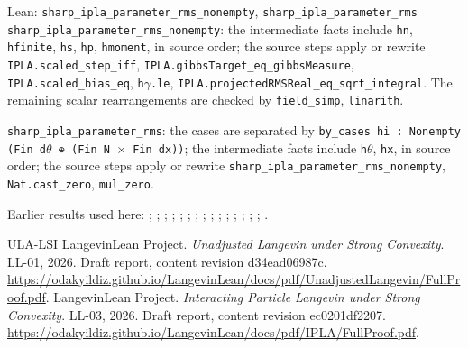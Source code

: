 \documentclass[11pt,a4paper]{article}
\begin{document}
\begin{leanbox}{Lean: \texttt{sharp\_\allowbreak{}ipla\_\allowbreak{}parameter\_\allowbreak{}rms\_\allowbreak{}nonempty}, \texttt{sharp\_\allowbreak{}ipla\_\allowbreak{}parameter\_\allowbreak{}rms}}
\texttt{sharp\_\allowbreak{}ipla\_\allowbreak{}parameter\_\allowbreak{}rms\_\allowbreak{}nonempty}: the intermediate facts include \texttt{hn}, \texttt{hfinite}, \texttt{hs}, \texttt{hp}, \texttt{hmoment}, in source order; the source steps apply or rewrite \texttt{IPLA.\allowbreak{}scaled\_\allowbreak{}step\_\allowbreak{}iff}, \texttt{IPLA.\allowbreak{}gibbs\allowbreak{}Target\_\allowbreak{}eq\_\allowbreak{}gibbs\allowbreak{}Measure}, \texttt{IPLA.\allowbreak{}scaled\_\allowbreak{}bias\_\allowbreak{}eq}, \texttt{h\ensuremath{\gamma}.\allowbreak{}le}, \texttt{IPLA.\allowbreak{}projected\allowbreak{}RMSReal\_\allowbreak{}eq\_\allowbreak{}sqrt\_\allowbreak{}integral}. The remaining scalar rearrangements are checked by \texttt{field\_\allowbreak{}simp}, \texttt{linarith}.



\texttt{sharp\_\allowbreak{}ipla\_\allowbreak{}parameter\_\allowbreak{}rms}: the cases are separated by \texttt{by\_\allowbreak{}cases hi : Nonempty (Fin d\ensuremath{\theta} ⊕ (Fin N \ensuremath{\times} Fin dx))}; the intermediate facts include \texttt{h\ensuremath{\theta}}, \texttt{hx}, in source order; the source steps apply or rewrite \texttt{sharp\_\allowbreak{}ipla\_\allowbreak{}parameter\_\allowbreak{}rms\_\allowbreak{}nonempty}, \texttt{Nat.\allowbreak{}cast\_\allowbreak{}zero}, \texttt{mul\_\allowbreak{}zero}.
\end{leanbox}


Earlier results used here: \cite[Section~3.17.4]{LangevinLean2026ULASC}; \cite[Section~3.26.3]{LangevinLean2026ULASC}; \cite[Section~3.45.6]{LangevinLean2026ULASC}; \cite[Section~3.50.2]{LangevinLean2026ULASC}; \cite[Section~3.50.3]{LangevinLean2026ULASC}; \cite[Section~3.1.1]{LangevinLean2026IPLA}; \cite[Section~3.1.3]{LangevinLean2026IPLA}; \cite[Section~3.1.4]{LangevinLean2026IPLA}; \cite[Section~3.1.6]{LangevinLean2026IPLA}; \cite[Section~3.16.3]{LangevinLean2026IPLA}; \cite[Section~3.18.2]{LangevinLean2026IPLA}; \cite[Section~3.3.1]{LangevinLean2026IPLA}; \cite[Section~3.3.2]{LangevinLean2026IPLA}; \cite[Section~3.3.3]{LangevinLean2026IPLA}; \cite[Section~3.5.1]{LangevinLean2026IPLA}; \cite[Section~3.7.1]{LangevinLean2026IPLA}.

\begin{thebibliography}{ULA-LSI}
LangevinLean Project. \emph{Unadjusted Langevin under Strong Convexity}. LL-01, 2026. Draft report, content revision d34ead06987c. \url{https://odakyildiz.github.io/LangevinLean/docs/pdf/UnadjustedLangevin/FullProof.pdf}.
LangevinLean Project. \emph{Interacting Particle Langevin under Strong Convexity}. LL-03, 2026. Draft report, content revision ec0201df2207. \url{https://odakyildiz.github.io/LangevinLean/docs/pdf/IPLA/FullProof.pdf}.
\end{thebibliography}
\end{document}
